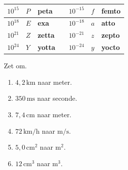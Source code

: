 \documentclass{ximera}
\begin{document}
\begin{center}
\begin{tabular}{|l|l|l|l|l|l|l|}
\hline
\textbf{$10^{15}$}                             & \textbf{$P$}                                  & \textbf{peta}                                  &   & \textbf{$10^{-15}$}                                  & \textbf{$f$}                                 & \textbf{femto}                                   \\ 
\hline
\textbf{$10^{18}$}                               & \textbf{$E$}                                & \textbf{exa}                                   &   & \textbf{$10^{-18}$}                                 & \textbf{$a$}                                  & \textbf{atto}                                    \\ 
\hline
\textbf{$10^{21}$}                                & \textbf{$Z$}                                  & \textbf{zetta}                                 &   & \textbf{$10^{-21}$  }                              & \textbf{$z$ }                                & \textbf{zepto}                                   \\ 
\hline
\textbf{$10^{24}$}                             & \textbf{$Y$}                                & \textbf{yotta}                                 &   & \textbf{$10^{-24}$}                                 & \textbf{$y$   }                              & \textbf{yocto}                                   \\
\hline
\end{tabular}
\renewcommand{\arraystretch}{1}
\end{center}


\begin{oefening}{\oefB\ESS}

Zet om.

\begin{enumerate}
  \item $4{,}2\,\mathrm{km}$ naar meter.
  \item $350\,\mathrm{ms}$ naar seconde.
  \item $7{,}4\,\mathrm{cm}$ naar meter.
  \item $72\,\mathrm{km/h}$ naar $\mathrm{m/s}$.
  \item $5{,}0\,\mathrm{cm^2}$ naar $\mathrm{m^2}$.
  \item $12\,\mathrm{cm^3}$ naar $\mathrm{m^3}$.
\end{enumerate}

\end{oefening}
\end{document}
